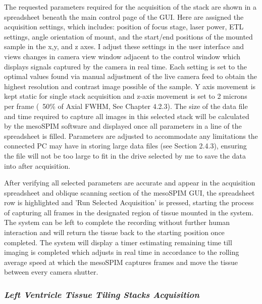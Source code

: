 The requested parameters required for the acquisition of the stack are shown in a spreadsheet beneath the main control page of the GUI. Here are assigned the acquisition settings, which includes: position of focus stage, laser power, ETL settings, angle orientation of mount, and the start/end positions of the mounted sample in the x,y, and z axes. I adjust these settings in the user interface and views changes in camera view window adjacent to the control window which displays signals captured by the camera in real time. Each setting is set to the optimal values found via manual adjustment of the live camera feed to obtain the highest resolution and contrast image possible of the sample. Y axis movement is kept static for single stack acquisition and z-axis movement is set to 2 microns per frame (~50\% of Axial FWHM, See Chapter 4.2.3). The size of the data file and time required to capture all images in this selected stack will be calculated by the mesoSPIM software and displayed once all parameters in a line of the spreadsheet is filled. Parameters are adjusted to accommodate any limitations the connected PC may have in storing large data files (see Section 2.4.3), ensuring the file will not be too large to fit in the drive selected by me to save the data into after acquisition. 

After verifying all selected parameters are accurate and appear in the acquisition spreadsheet and oblique scanning section of the mesoSPIM GUI, the spreadsheet row is highlighted and 'Run Selected Acquisition' is pressed, starting the process of capturing all frames in the designated region of tissue mounted in the system. The system can be left to complete the recording without further human interaction and will return the tissue back to the starting position once completed. The system will display a timer estimating remaining time till imaging is completed which adjusts in real time in accordance to the rolling average speed at which the mesoSPIM captures frames and move the tissue between every camera shutter.


\subsubsection{\textit{Left Ventricle Tissue Tiling Stacks Acquisition}}

